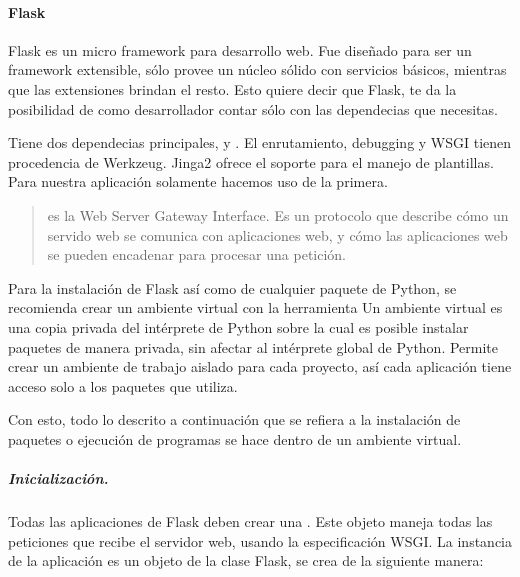 \paragraph{Flask}
\label{\detokenize{chapter_two/desc_cloudnao:flask}}

Flask es un micro framework para desarrollo web. Fue diseñado para ser un
framework extensible, sólo provee un núcleo sólido con servicios básicos,
mientras que las extensiones brindan el resto. Esto quiere decir que Flask,
te da la posibilidad de como desarrollador contar sólo con las dependecias que
necesitas.

Tiene dos dependecias principales,  y .
El enrutamiento, debugging y WSGI tienen procedencia de Werkzeug.
Jinga2 ofrece el soporte para el manejo de plantillas. Para nuestra
aplicación solamente hacemos uso de la primera.
\begin{quote}

 es la Web Server Gateway Interface. Es un protocolo que describe
cómo un servido web se comunica con aplicaciones web, y cómo las aplicaciones
web se pueden encadenar para procesar una petición.
\end{quote}

Para la instalación de Flask así como de cualquier paquete de Python, se
recomienda crear un ambiente virtual con la herramienta 
Un ambiente virtual es una copia privada del intérprete de Python sobre la cual
es posible instalar paquetes de manera privada, sin afectar al intérprete
global de Python. Permite crear un ambiente de trabajo aislado para cada
proyecto, así cada aplicación tiene acceso solo a los paquetes que utiliza.

Con esto, todo lo descrito a continuación que se refiera a la instalación de
paquetes o ejecución de programas se hace dentro de un ambiente virtual.


\subparagraph{Inicialización.}
\label{\detokenize{chapter_two/desc_cloudnao:inicializacion}}
Todas las aplicaciones de Flask deben crear una . Este
objeto maneja todas las peticiones que recibe el servidor web, usando
la especificación WSGI.
La instancia de la aplicación es un objeto de la clase Flask,
se crea de la siguiente manera:

\begin{sphinxVerbatim}[commandchars=\\\{\}]
   
  
\end{sphinxVerbatim}

